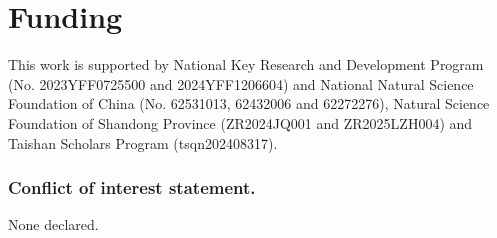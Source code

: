 \documentclass[a4,center,fleqn]{NAR}
\begin{document}
\section{Funding}
This work is supported by National Key Research and Development Program (No. 2023YFF0725500 and 2024YFF1206604) and National Natural Science Foundation of China (No. 62531013, 62432006 and 62272276),  Natural Science Foundation of Shandong Province (ZR2024JQ001 and ZR2025LZH004) and Taishan Scholars Program (tsqn202408317).

\subsubsection{Conflict of interest statement.} 
None declared.


% 







\end{document}
